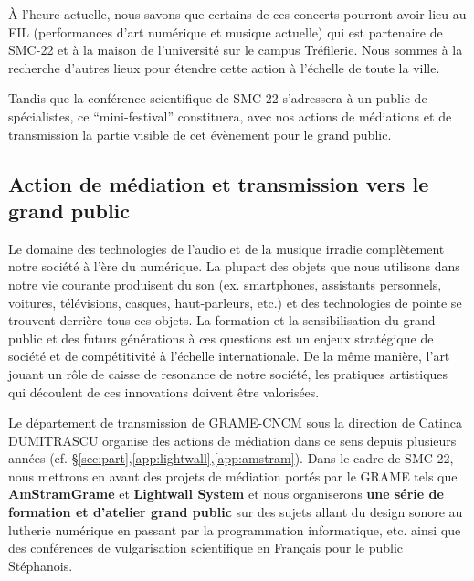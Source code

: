\documentclass[fontsize=12pt]{scrartcl} %
\numberwithin{equation}{section} %
\numberwithin{figure}{section} %
\numberwithin{table}{section} %
\begin{document}
À l'heure actuelle, nous savons que certains de ces concerts pourront avoir lieu au FIL (performances d'art numérique et musique actuelle) qui est partenaire de SMC-22 et à la maison de l'université sur le campus Tréfilerie. Nous sommes à la recherche d'autres lieux pour étendre cette action à l'échelle de toute la ville. 

Tandis que la conférence scientifique de SMC-22 s'adressera à un public de spécialistes, ce ``mini-festival'' constituera, avec nos actions de médiations et de transmission la partie visible de cet évènement pour le grand public.

\subsection{Action de médiation et transmission vers le grand public}

Le domaine des technologies de l'audio et de la musique irradie complètement notre société à l'ère du numérique. La plupart des objets que nous utilisons dans notre vie courante produisent du son (ex. smartphones, assistants personnels, voitures, télévisions, casques, haut-parleurs, etc.) et des technologies de pointe se trouvent derrière tous ces objets. La formation et la sensibilisation du grand public et des futurs générations à ces questions est un enjeux stratégique de société et de compétitivité à l'échelle internationale. De la même manière, l'art jouant un rôle de caisse de resonance de notre société, les pratiques artistiques qui découlent de ces innovations doivent être valorisées. %

Le département de transmission de GRAME-CNCM sous la direction de Catinca DUMITRASCU organise des actions de médiation dans ce sens depuis plusieurs années (cf. \S\ref{sec:part},\ref{app:lightwall},\ref{app:amstram}). Dans le cadre de SMC-22, nous mettrons en avant des projets de médiation portés par le GRAME tels que \textbf{AmStramGrame} et \textbf{Lightwall System} et nous organiserons \textbf{une série de formation et d'atelier grand public} sur des sujets allant du design sonore au lutherie numérique en passant par la programmation informatique, etc. ainsi que des conférences de vulgarisation scientifique en Français pour le public Stéphanois.
\end{document}
